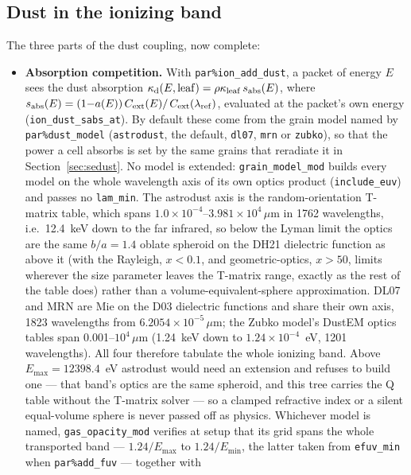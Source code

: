 \documentclass[english,a4paper]{my_memo}
\newcommand{\code}[1]{\texttt{#1}}
\begin{document}
\subsection{Dust in the ionizing band}
\label{sec:dust}
The three parts of the dust coupling, now complete:
\begin{itemize}
\item \textbf{Absorption competition.}  With \code{par\%ion\_add\_dust},
  a packet of energy $E$ sees the dust absorption
  $\kappa_{\rm d}(E,{\rm leaf}) = \rho\kappa_{\rm leaf}\,s_{\rm abs}(E)$,
  where $s_{\rm abs}(E) = (1{-}a(E))\,C_{\rm ext}(E)/$\allowbreak$C_{\rm ext}
  (\lambda_{\rm ref})$, evaluated at the packet's own energy
  (\code{ion\_dust\_\allowbreak sabs\_at}).  By default these come from the grain model
  named by \code{par\%dust\_model} (\code{astrodust}, the default,
  \code{dl07}, \code{mrn} or \code{zubko}),
  so that the power a cell absorbs is set by the same grains that
  reradiate it in Section~\ref{sec:sedust}.  No model is extended:
  \code{grain\_model\_mod} builds every model on the whole wavelength axis of
  its own optics product (\code{include\_euv}) and passes no
  \code{lam\_min}.  The astrodust axis is the random-orientation T-matrix
  table, which spans $1.0{\times}10^{-4}$--$3.981{\times}10^{4}\,\mu$m in
  1762 wavelengths, i.e.\ 12.4~keV down to the far infrared, so below the
  Lyman limit the optics are the same $b/a = 1.4$ oblate spheroid on the
  DH21 dielectric function as above it (with the Rayleigh, $x < 0.1$, and
  geometric-optics, $x > 50$, limits wherever the size parameter leaves the
  T-matrix range, exactly as the rest of the table does) rather than a
  volume-equivalent-sphere approximation.  DL07 and MRN are Mie on the D03
  dielectric functions and share their own axis, 1823 wavelengths from
  $6.2054{\times}10^{-5}\,\mu$m; the Zubko model's DustEM optics tables span
  0.001--$10^4\,\mu$m (1.24~keV down to $1.24{\times}10^{-4}$~eV, 1201
  wavelengths).  All four therefore tabulate the whole ionizing band.
  Above $E_{\max} = 12398.4$~eV astrodust would need an extension and
  refuses to build one --- that band's optics are the same spheroid, and
  this tree carries the Q table without the T-matrix solver --- so a
  clamped refractive index or a silent equal-volume sphere is never passed
  off as physics.  Whichever model is named,
  \code{gas\_opacity\_mod} verifies at setup that its grid spans the whole
  transported band --- $1.24/E_{\max}$ to $1.24/E_{\min}$, the latter taken
  from \code{efuv\_min} when \code{par\%add\_fuv} --- together with

\end{itemize}
\end{document}
